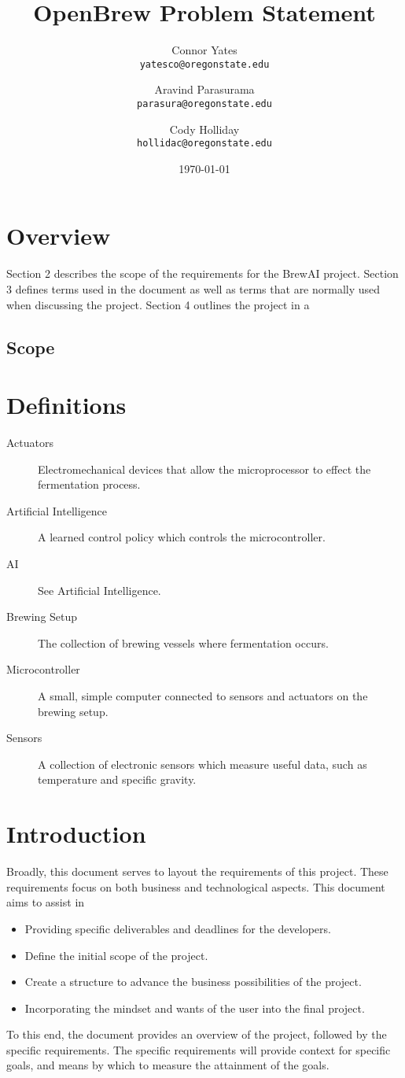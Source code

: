 \documentclass[draftclsnofoot,onecolumn,letterpaper,10pt]{article}
\author{Connor Yates\\
\texttt{yatesco@oregonstate.edu}
\and
Aravind Parasurama\\
\texttt{parasura@oregonstate.edu}
\and
Cody Holliday\\
\texttt{hollidac@oregonstate.edu}}
\date{\today}
\title{OpenBrew Problem Statement}
\begin{document}
\maketitle
\section{Overview}
Section 2 describes the scope of the requirements for the BrewAI project.
Section 3 defines terms used in the document as well as terms that are
normally used when discussing the project. Section 4 outlines the project
in a 
\subsection{Scope}

\section{Definitions}
\begin{description}
	\item[Actuators] Electromechanical devices that allow the microprocessor to effect the fermentation process.
	\item[Artificial Intelligence] A learned control policy which controls the microcontroller.
	\item[AI] See Artificial Intelligence.
	\item[Brewing Setup] The collection of brewing vessels where fermentation occurs.
	\item[Microcontroller] A small, simple computer connected to sensors and actuators on the brewing setup.
	\item[Sensors] A collection of electronic sensors which measure useful data, such as temperature and specific gravity.
\end{description}

\section{Introduction}
Broadly, this document serves to layout the requirements of this project.
These requirements focus on both business and technological aspects.
This document aims to assist in
\begin{itemize}
	\item Providing specific deliverables and deadlines for the developers.
	\item Define the initial scope of the project.
	\item Create a structure to advance the business possibilities of the project.
	\item Incorporating the mindset and wants of the user into the final project.
\end{itemize}
To this end, the document provides an overview of the project, followed by the specific requirements.
The specific requirements will provide context for specific goals, and means by which to measure the attainment of the goals.
\end{document}
